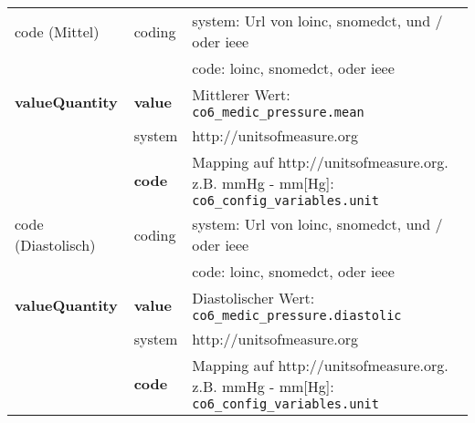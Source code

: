 \begin{longtable}{|l|l|p{7cm}|}
	code (Mittel)  & coding & system: Url von \ac{loinc}, \ac{snomedct}, und / oder \ac{ieee} \\ 
	\cline{3-3} 
	&  & code: \ac{loinc}, \ac{snomedct}, oder \ac{ieee} \\ \hline	
	\textbf{valueQuantity} & \textbf{value} & Mittlerer Wert: \texttt{co6\_medic\_pressure.mean} \\
	\cline{2-3}
	& system & http://unitsofmeasure.org \\ 
	\cline{2-3}
	& \textbf{code} & Mapping auf http://unitsofmeasure.org. z.B. mmHg - mm[Hg]: \texttt{co6\_config\_variables.unit} \\ \hline
	code (Diastolisch)  & coding & system: Url von \ac{loinc}, \ac{snomedct}, und / oder \ac{ieee} \\ 
	\cline{3-3} 
	&  & code: \ac{loinc}, \ac{snomedct}, oder \ac{ieee} \\ \hline	
	\textbf{valueQuantity} & \textbf{value} & Diastolischer Wert: \texttt{co6\_medic\_pressure.diastolic} \\
	\cline{2-3}
	& system & http://unitsofmeasure.org \\ 
	\cline{2-3}
	& \textbf{code} & Mapping auf http://unitsofmeasure.org. z.B. mmHg - mm[Hg]: \texttt{co6\_config\_variables.unit} \\ \hline
\end{longtable}
\clearpage
